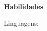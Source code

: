 \noindent\textbf{Habilidades}
\noindent\hrulefill
\vspace{0.25em}
\begin{adjustwidth}{1.5em}{0em}
Linguagens:
\end{adjustwidth}
\vspace{0.25em}